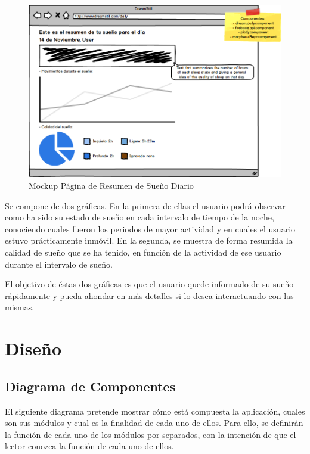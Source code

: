 \documentclass[11pt,openany]{book}
\begin{document}
\begin{figure}[H]
\centering
\includegraphics[totalheight=6.5cm]{mockups/DailyDreamPage.png}
\caption{Mockup Página de Resumen de Sueño Diario}
\end{figure}
\par\bigskip 
\noindent

Se compone de dos gráficas. En la primera de ellas el usuario podrá observar como ha sido su estado de sueño en cada intervalo de tiempo de la noche, conociendo cuales fueron los periodos de mayor actividad y en cuales el usuario estuvo prácticamente inmóvil. En la segunda, se muestra de forma resumida la calidad de sueño que se ha tenido, en función de la actividad de ese usuario durante el intervalo de sueño. 

El objetivo de éstas dos gráficas es que el usuario quede informado de su sueño rápidamente y pueda ahondar en más detalles si lo desea interactuando con las mismas.

\section{Diseño}

\subsection{Diagrama de Componentes}
 
 El siguiente diagrama pretende mostrar cómo está compuesta la aplicación, cuales son sus módulos y cual es la finalidad de cada uno de ellos. Para ello, se definirán la función de cada uno de los módulos por separados, con la intención de que el lector conozca la función de cada uno de ellos.
 
\end{document}
